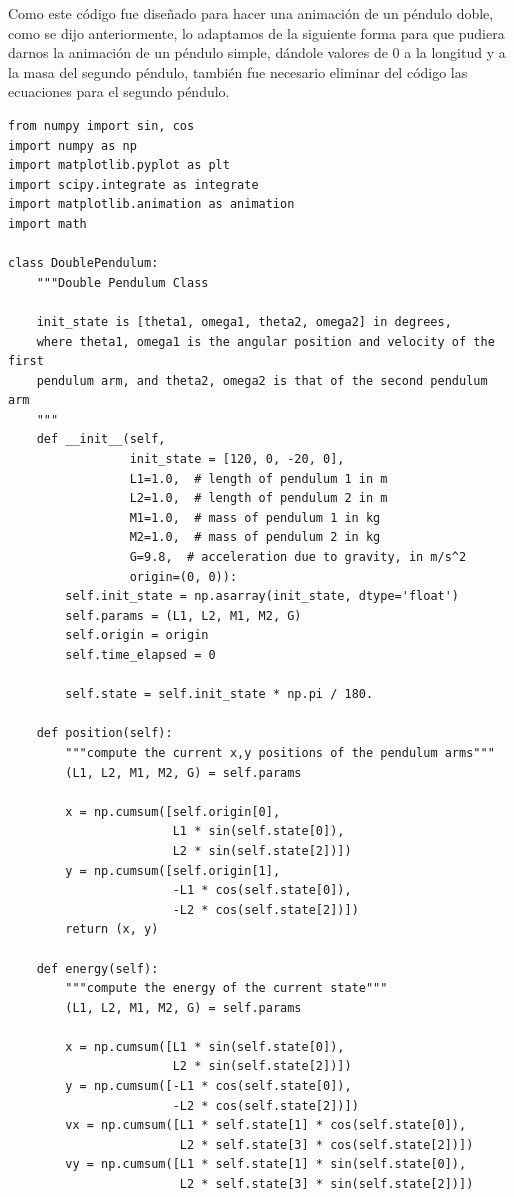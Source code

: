 \documentclass[12pt,letterpaper]{article}
\begin{document}
Como este código fue diseñado para hacer una animación de un péndulo doble, como se dijo anteriormente, lo adaptamos de la siguiente forma para que pudiera darnos la animación de un péndulo simple, dándole valores de $0$ a la longitud y a la masa del segundo péndulo, también fue necesario eliminar del código las ecuaciones para el segundo péndulo. \\

\begin{verbatim}
from numpy import sin, cos
import numpy as np
import matplotlib.pyplot as plt
import scipy.integrate as integrate
import matplotlib.animation as animation
import math

class DoublePendulum:
    """Double Pendulum Class

    init_state is [theta1, omega1, theta2, omega2] in degrees,
    where theta1, omega1 is the angular position and velocity of the first
    pendulum arm, and theta2, omega2 is that of the second pendulum arm
    """
    def __init__(self,
                 init_state = [120, 0, -20, 0],
                 L1=1.0,  # length of pendulum 1 in m
                 L2=1.0,  # length of pendulum 2 in m
                 M1=1.0,  # mass of pendulum 1 in kg
                 M2=1.0,  # mass of pendulum 2 in kg
                 G=9.8,  # acceleration due to gravity, in m/s^2
                 origin=(0, 0)): 
        self.init_state = np.asarray(init_state, dtype='float')
        self.params = (L1, L2, M1, M2, G)
        self.origin = origin
        self.time_elapsed = 0

        self.state = self.init_state * np.pi / 180.
    
    def position(self):
        """compute the current x,y positions of the pendulum arms"""
        (L1, L2, M1, M2, G) = self.params

        x = np.cumsum([self.origin[0],
                       L1 * sin(self.state[0]),
                       L2 * sin(self.state[2])])
        y = np.cumsum([self.origin[1],
                       -L1 * cos(self.state[0]),
                       -L2 * cos(self.state[2])])
        return (x, y)

    def energy(self):
        """compute the energy of the current state"""
        (L1, L2, M1, M2, G) = self.params

        x = np.cumsum([L1 * sin(self.state[0]),
                       L2 * sin(self.state[2])])
        y = np.cumsum([-L1 * cos(self.state[0]),
                       -L2 * cos(self.state[2])])
        vx = np.cumsum([L1 * self.state[1] * cos(self.state[0]),
                        L2 * self.state[3] * cos(self.state[2])])
        vy = np.cumsum([L1 * self.state[1] * sin(self.state[0]),
                        L2 * self.state[3] * sin(self.state[2])])


\end{verbatim}
\end{document}
